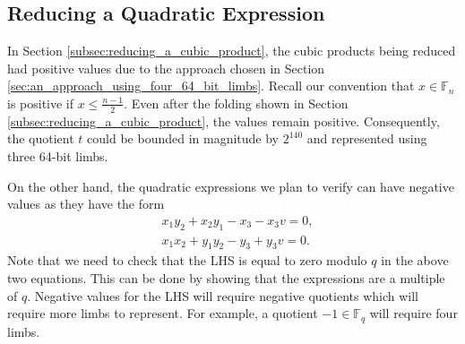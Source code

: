 \documentclass[a4paper, 12pt]{article}
\begin{document}
\subsection{Reducing a Quadratic Expression}%
\label{subsec:reducing_a_quadratic_expression}
In Section \ref{subsec:reducing_a_cubic_product}, the cubic products being reduced had positive values due to the approach chosen in Section \ref{sec:an_approach_using_four_64_bit_limbs}. Recall our convention that $x \in \mathbb{F}_n$ is positive if $x \le \frac{n-1}{2}$. Even after the folding shown in Section \ref{subsec:reducing_a_cubic_product}, the values remain positive. Consequently, the quotient $t$ could be bounded in magnitude by $2^{140}$ and represented using three 64-bit limbs.

On the other hand, the quadratic expressions we plan to verify can have negative values as they have the form
\begin{align*}
  & x_1y_2 + x_2y_1 -x_3 - x_3 v = 0,\\
  & x_1x_2 + y_1y_2 -y_3 + y_3 v = 0.
\end{align*}
Note that we need to check that the LHS is equal to zero modulo $q$ in the above two equations. This can be done by showing that the expressions are a multiple of $q$. Negative values for the LHS will require negative quotients which will require more limbs to represent. For example, a quotient $-1 \in \mathbb{F}_q$ will require four limbs.
\end{document}
